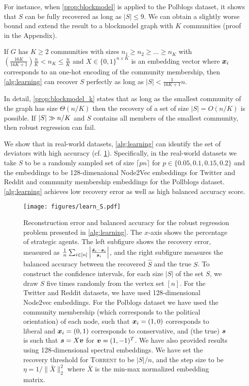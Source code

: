 For instance, when \cref{prop:blockmodel} is applied to the Polblogs dataset, it shows that $S$ can be fully recovered as long as $|S| \le 9$. We can obtain a slightly worse bound and extend the result to a blockmodel graph with $K$ communities (proof in the Appendix). 

\begin{prop} \label{prop:blockmodel_k}
    If $G$ has $K \ge 2$ communities with sizes $n_1 \ge n_2 \ge \dots \ge n_K$  with $\left ( \frac {16K} {16K + 1} \right ) \frac n K < n_K \le \frac n K$ and $X \in \{ 0, 1 \}^{n \times K}$ is an embedding vector where $\bm{x}_i$ corresponds to an one-hot encoding of the community membership, then \cref{alg:learning} can recover $S$ perfectly as long as $|S| < \frac {1} {16K + 1} n$.  
\end{prop}

In detail, \cref{prop:blockmodel_k} states that as long as the smallest community of the graph has size $\Theta (n/K)$ then the recovery of a set of size $|S| = O(n/K)$ is possible. If $\lvert S\rvert \gg n/K$ and $S$ contains all members of the smallest community, then robust regression can fail. 

We show that in real-world datasets, \cref{alg:learning} can identify the set of deviators with high accuracy (cf. \cref{fig:learn_S}). Specifically, in the real-world datasets we take $S$ to be a randomly sampled set of size $\lceil pn \rceil$ for $p \in \{ 0.05, 0.1, 0.15, 0.2 \}$ and the embeddings to be 128-dimenaional Node2Vec embeddings for Twitter and Reddit and community membership embeddings for the Pollblogs dataset. \cref{alg:learning} achieves low recovery error as well as high balanced accuracy score.

\begin{figure}
    \centering
    \texttt{[image: figures/learn\_S.pdf]}
    \caption{Reconstruction error and balanced accuracy for the robust regression problem presented in \cref{alg:learning}. The $x$-axis shows the percentage of strategic agents. The left subfigure shows the recovery error, measured as $\frac 1 n \sum_{i \in [n]} \left  | \frac {\hat {\bm{s}}_i - \bm{s}_i} {\bm{s}_i} \right |$, and the right subfigure measures the balanced accuracy between the recovered $\hat S$ and the true $S$. To construct the confidence intervals, for each size $|S|$ of the set $S$, we draw $S$ five times randomly from the vertex set $[n]$. For the Twitter and Reddit datasets, we have used 128-dimensional Node2vec embeddings. For the Polblogs dataset we have used the community membership (which corresponds to the political orientation) of each node, such that $\bm{x}_i = (1, 0)$ corresponds to liberal and $\bm{x}_i = (0, 1)$ corresponds to conservative, and (the true) $\bm{s}$ is such that $\bm{s} = X \bm{v}$ for $\bm{v} = (1, -1)^T$. We have also provided results using 128-dimensional spectral embeddings. We have set the recovery threshold for \textsc{Torrent} to be $|S|/n$, and the step size to be $\eta = 1 / \| \bar X \|_2^2$ where $\bar X$ is the min-max normalized embedding matrix.}
    \label{fig:learn_S}
\end{figure}





